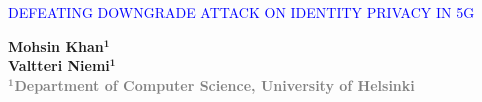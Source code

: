 \documentclass[portrait,a0]{a0poster}
\begin{document}



\begin{multicols}{2} 
\begin{minipage}[t]{1.5\linewidth}
\vspace{10pt}
\begin{flushleft}
\begin{spacing}{5}
{\huge{}\textcolor{blue}{\MakeUppercase{Defeating Downgrade Attack on Identity Privacy in 5G}} \MakeUppercase{}} \\

\end{spacing}
\end{flushleft}
\end{minipage}

\begin{minipage}[t]{.95\linewidth} %
\vspace{-110pt} %
\begin{flushright}
\textsf{\bfseries
Mohsin Khan$^\textbf{1}$ \\
Valtteri Niemi$^\textbf{1}$\\
} %
\textcolor{gray}{\textsf{\bfseries{$^\textbf{1}$Department of Computer Science, University of Helsinki}}}\\
\end{flushright}
\end{minipage}
\end{multicols}

\vspace{-70pt}
\noindent\makebox[\linewidth]{\rule{\paperwidth}{5pt}}
\end{document}
